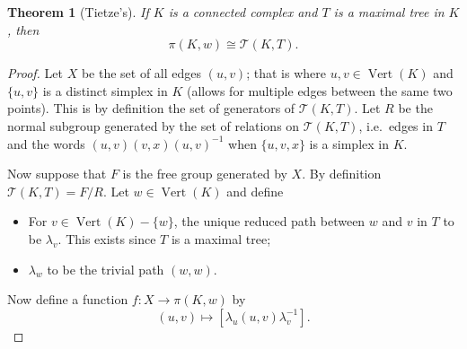 \documentclass[12pt]{article}
\newtheorem{theorem}{Theorem}
\theoremstyle{definition}
\numberwithin{equation}{theorem}
\begin{document}
\begin{theorem}[Tietze's]
  If $K$ is a connected complex and $T$ is a maximal tree in $K$, then
  \[
    \pi(K,w) \cong \mathcal{T}(K,T).
  \]
\end{theorem}

\begin{proof}
  Let $X$ be the set of all edges $(u,v)$; that is where $u,v \in \operatorname{Vert}(K)$ and $\{ u,v \}$ is a distinct simplex in $K$ (allows for multiple edges between the same two points). This is by definition the set of generators of $\mathcal{T}(K,T)$. Let $R$ be the normal subgroup generated by the set of relations on $\mathcal{T}(K,T)$, i.e.\ edges in $T$ and the words $(u,v)(v,x)(u,v)^{-1}$ when $\{u,v,x \}$ is a simplex in $K$.

  Now suppose that $F$ is the free group generated by $X$. By definition $\mathcal{T}(K,T) = F/R$. Let $w \in \operatorname{Vert}(K)$ and define
  \begin{itemize}
  \item For $v \in \operatorname{Vert}(K) - \{w\}$, the unique reduced path between $w$ and $v$ in $T$ to be $\lambda_v$. This exists since $T$ is a maximal tree;
  \item $\lambda_w$ to be the trivial path $(w,w)$.
  \end{itemize}

Now define a function $f:X \rightarrow \pi(K,w)$ by
\begin{equation*}
  (u,v) \mapsto [\lambda_u(u,v)\lambda_v^{-1}].
\end{equation*}


\end{proof}
\end{document}
